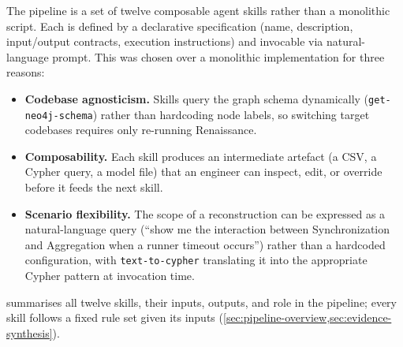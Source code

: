 The pipeline is a set of twelve composable agent skills rather than a
monolithic script. Each is defined by a declarative specification (name,
description, input/output contracts, execution instructions) and
invocable via natural-language prompt. This was chosen over a monolithic
implementation for three reasons:

\begin{itemize}
  \item \textbf{Codebase agnosticism.} Skills query the graph schema
    dynamically (\texttt{get-neo4j-schema}) rather than hardcoding node
    labels, so switching target codebases requires only re-running
    Renaissance.
  \item \textbf{Composability.} Each skill produces an intermediate
    artefact (a CSV, a Cypher query, a model file) that an engineer can
    inspect, edit, or override before it feeds the next skill.
  \item \textbf{Scenario flexibility.} The scope of a reconstruction can
    be expressed as a natural-language query (``show me the interaction
    between Synchronization and Aggregation when a runner timeout
    occurs'') rather than a hardcoded configuration, with
    \texttt{text-to-cypher} translating it into the appropriate Cypher
    pattern at invocation time.
\end{itemize}

 summarises all twelve skills, their inputs, outputs,
and role in the pipeline; every skill follows a fixed rule set given its
inputs (\cref{sec:pipeline-overview,sec:evidence-synthesis}).

